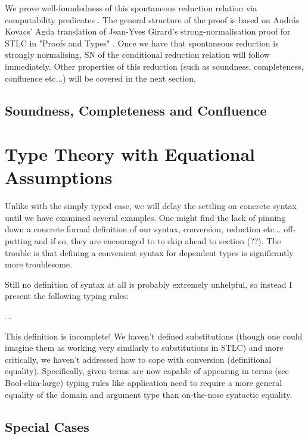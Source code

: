 \documentclass[
    a4paper, %
    fontsize=11pt, %
    twoside=false, %
	numbers=noenddot, %
	fontmethod=tex, %
]{kaobook}
\begin{document}
We prove well-foundedness of this spontaneous reduction relation via 
computability predicates . The general 
structure of the proof is based on András Kovacs' 
Agda translation  of Jean-Yves Girard's 
strong-normalisation proof for STLC in "Proofs and Types" 
. Once we have that spontaneous reduction is
strongly normalising, SN of the conditional reduction relation will follow
immediately. Other properties of this reduction (such as soundness, 
completeness, confluence etc...) will be covered in the next section.

\section{Soundness, Completeness and Confluence}



\chapter{Type Theory with Equational Assumptions}

Unlike with the simply typed case, we will delay the settling on concrete syntax
until we have examined several examples. One might find the lack of pinning down
a concrete formal definition of our syntax, conversion, reduction etc...
off-putting and if so, they are encouraged to to skip ahead to section (??).
The trouble is that defining a convenient  syntax for dependent types is
significantly more troublesome.

Still no definition of syntax at all is probably extremely unhelpful, so instead
I present the following typing rules:

...

This definition is incomplete! We haven't defined substitutions (though one
could imagine them as working very similarly to substitutions in STLC) and more
critically, we haven't addressed how to cope with conversion (definitional
equality). Specifically, given terms are now capable of appearing in terms
(see Bool-elim-large) typing rules like application need to require a more
general equality of the domain and argument type than on-the-nose syntactic
equality.

\section{Special Cases}
\end{document}
